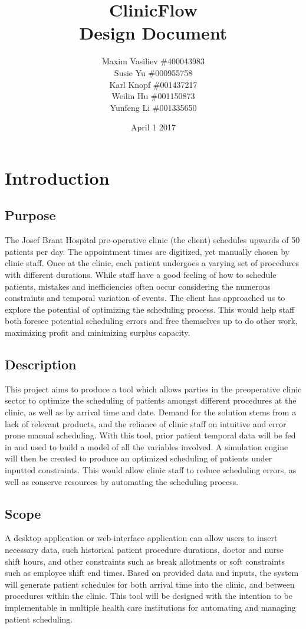 \documentclass[12pt]{article}
\title{
ClinicFlow
\\\vspace{10mm}
\large \textbf{Design Document}
\vspace{40mm}
}
\author{ Maxim Vasiliev \#400043983\\
Susie Yu \#000955758\\
Karl Knopf \#001437217\\
Weilin Hu \#001150873\\
Yunfeng Li \#001335650
}
\date{April 1 2017}
\begin{document}
\maketitle
\newpage
\tableofcontents
\newpage
{}


\section{Introduction}

\subsection{Purpose}
The Josef Brant Hospital pre-operative clinic (the client) schedules upwards of 50 patients per day. The appointment times are digitized, yet manually chosen by clinic staff. Once at the clinic, each patient undergoes a varying set of procedures with different durations. While staff have a good feeling of how to schedule patients, mistakes and inefficiencies often occur considering the numerous constraints and temporal variation of events. The client has approached us to explore the potential of optimizing the scheduling process. This would help staff both foresee potential scheduling errors and free themselves up to do other work, maximizing profit and minimizing surplus capacity.

\subsection{Description}
This project aims to produce a tool which allows parties in the preoperative clinic sector to optimize the scheduling of patients amongst different procedures at the clinic, as well as by arrival time and date. Demand for the solution stems from a lack of relevant products, and the reliance of clinic staff on intuitive and error prone manual scheduling. With this tool, prior patient temporal data will be fed in and used to build a model of all the variables involved. A simulation engine will then be created to produce an optimized scheduling of patients under inputted constraints. This would allow clinic staff to reduce scheduling errors, as well as conserve resources by automating the scheduling process.

\subsection{Scope}
A desktop application or web-interface application can allow users to insert necessary data, such historical patient procedure durations, doctor and nurse shift hours, and other constraints such as break allotments or soft constraints such as employee shift end times. Based on provided data and inputs, the system will generate patient schedules for both arrival time into the clinic, and between procedures within the clinic. This tool will be designed with the intention to be implementable in multiple health care institutions for automating and managing patient scheduling.
\newpage
\end{document}
